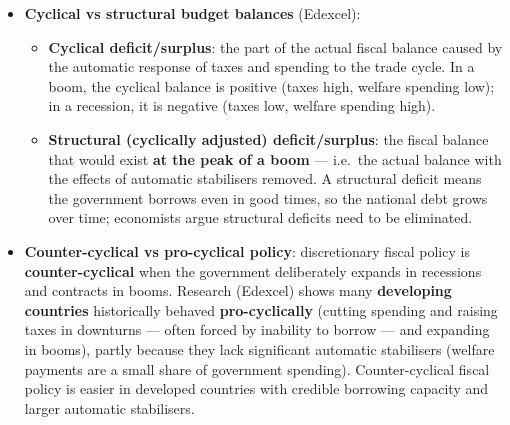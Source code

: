 \begin{itemize}
\begin{itemize}
    \item \textbf{Precision}: discretionary policy can target specific sectors and can be large enough to close deep gaps; automatic stabilisers only \textit{dampen} fluctuations --- they cannot prevent a recession or eliminate a gap on their own.
  \end{itemize}
  \item \textbf{Cyclical vs structural budget balances} (Edexcel):
  \begin{itemize}
    \item \textbf{Cyclical deficit/surplus}: the part of the actual fiscal balance caused by the automatic response of taxes and spending to the trade cycle. In a boom, the cyclical balance is positive (taxes high, welfare spending low); in a recession, it is negative (taxes low, welfare spending high).
    \item \textbf{Structural (cyclically adjusted) deficit/surplus}: the fiscal balance that would exist \textbf{at the peak of a boom} --- i.e.\ the actual balance with the effects of automatic stabilisers removed. A structural deficit means the government borrows even in good times, so the national debt grows over time; economists argue structural deficits need to be eliminated.
  \end{itemize}
  \item \textbf{Counter-cyclical vs pro-cyclical policy}: discretionary fiscal policy is \textbf{counter-cyclical} when the government deliberately expands in recessions and contracts in booms. Research (Edexcel) shows many \textbf{developing countries} historically behaved \textbf{pro-cyclically} (cutting spending and raising taxes in downturns --- often forced by inability to borrow --- and expanding in booms), partly because they lack significant automatic stabilisers (welfare payments are a small share of government spending). Counter-cyclical fiscal policy is easier in developed countries with credible borrowing capacity and larger automatic stabilisers.
\end{itemize}
